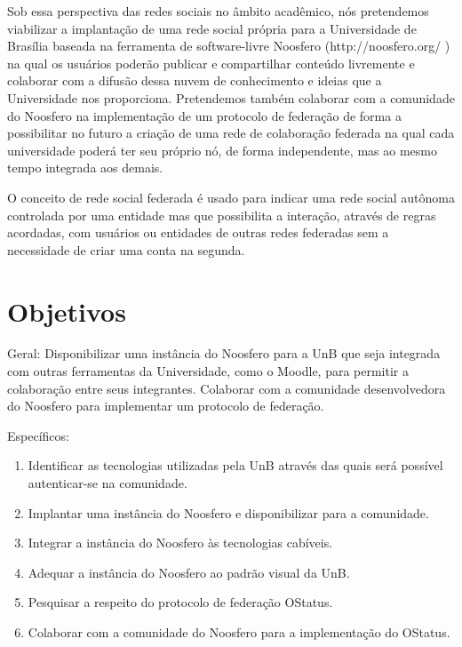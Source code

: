 Sob essa perspectiva das redes sociais no âmbito acadêmico, nós pretendemos viabilizar a implantação de uma rede social própria para a Universidade de Brasília baseada na ferramenta de software-livre Noosfero (http://noosfero.org/ ) na qual os usuários poderão publicar e compartilhar conteúdo livremente e colaborar com a difusão dessa nuvem de conhecimento e ideias que a Universidade nos proporciona. Pretendemos também colaborar com a comunidade do Noosfero na implementação de um protocolo de federação de forma a possibilitar no futuro a criação de uma rede de colaboração federada na qual cada universidade poderá ter seu próprio nó, de forma independente, mas ao mesmo tempo integrada aos demais.

O conceito de rede social federada é usado para indicar uma rede social autônoma controlada por uma entidade mas que possibilita a interação, através de regras acordadas, com usuários ou entidades de outras redes federadas sem a necessidade de criar uma conta na segunda.

\section{Objetivos}

Geral: Disponibilizar uma instância do Noosfero para a UnB que seja integrada com outras ferramentas da Universidade, como o Moodle, para permitir a colaboração entre seus integrantes. Colaborar com a comunidade desenvolvedora do Noosfero para implementar um protocolo de federação.

Específicos:

\begin{enumerate}
	
\item Identificar as tecnologias utilizadas pela UnB através das quais será possível autenticar-se na comunidade.
\item Implantar uma instância do Noosfero e disponibilizar para a comunidade.
\item Integrar a instância do Noosfero às tecnologias cabíveis.
\item Adequar a instância do Noosfero ao padrão visual da UnB.
\item Pesquisar a respeito do protocolo de federação OStatus.
\item Colaborar com a comunidade do Noosfero para a implementação do OStatus.

\end{enumerate}

